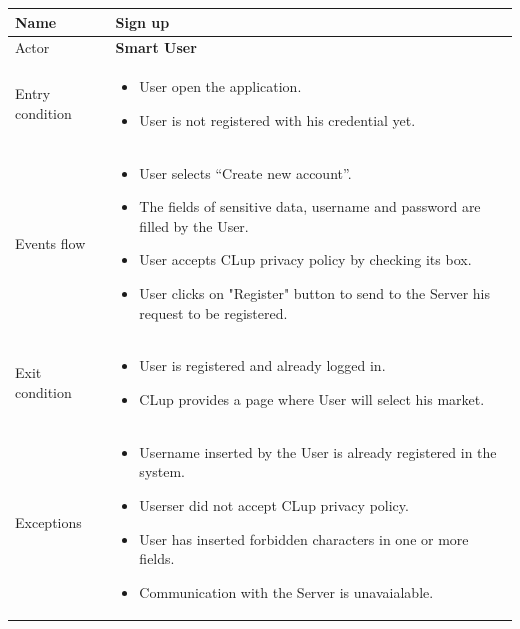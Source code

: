 \par \medskip

\begin{tabular}{|p{5cm} | p{7cm} | }
	\hline
	Name & \textbf{Sign up} \\
	\hline
	Actor & \textbf{Smart User} \\
	\hline
	Entry condition &
	\begin{itemize}
		\item User open the application.
        \item User is not registered with his credential yet. 
	\end{itemize} \\
	\hline
	Events flow & 
	\begin{itemize}
		\item User selects “Create new account”.
		\item The fields of sensitive data, username and password are filled by the User.
		\item User accepts CLup privacy policy by checking its box.
		\item User clicks on "Register" button to send to the Server his request to be registered.
	\end{itemize} \\
	\hline
	Exit condition & \begin{itemize} 
    \item User is registered and already logged in. 
    \item CLup provides a page where User will select his market.
    \end{itemize}\\
	\hline 
	Exceptions &
	\begin{itemize}
		\item Username inserted by the User is already registered in the system.
		\item Userser did not accept CLup privacy policy.
		\item User has inserted forbidden characters in one or more fields.
        \item Communication with the Server is unavaialable.
	\end{itemize} \\
	\hline
\end{tabular}

\par \medskip

